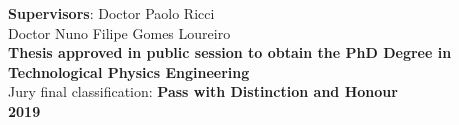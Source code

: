 \begin{titlepage}
\hspace{-2.5cm}\large \textbf{Supervisors}: Doctor Paolo Ricci
\\\hspace{-2.5cm} \hspace{5.15cm} Doctor Nuno Filipe Gomes Loureiro
\\ \vspace{13mm}
\Large \textbf{Thesis approved in public session to obtain the PhD Degree in Technological Physics Engineering}
\\ \vspace{13mm}
\Large {Jury final classification: \textbf{Pass with Distinction and Honour}}
\vspace{13mm} \\
\Large \textbf{2019} \\
\let\thepage\relax
\pagebreak

\end{titlepage}



